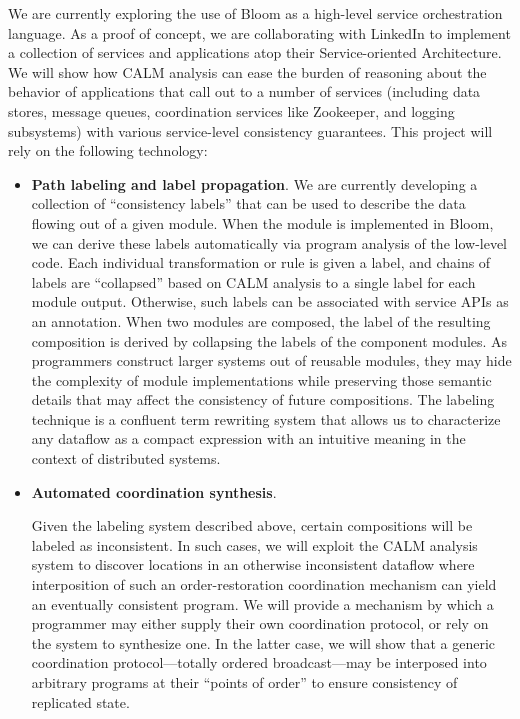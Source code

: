 We are currently exploring the use of Bloom as a high-level service orchestration language.
As a proof of concept, we are collaborating with LinkedIn to implement a collection of services and applications atop
their Service-oriented Architecture.
We will show how CALM analysis can ease the burden of reasoning about the behavior of applications
that call out to a number of services (including data stores, message queues, coordination services like Zookeeper, 
and logging subsystems)
with various service-level consistency guarantees.
This project will rely on the following technology:

\begin{itemize}
\item \textbf{Path labeling and label propagation}.
We are currently developing a collection of ``consistency labels'' that 
can be used to describe the data flowing out of a given module.  When the module
is implemented in Bloom, we can derive these labels automatically via program
analysis of the low-level code.  Each individual transformation or rule is 
given a label, and chains of labels are ``collapsed'' based on CALM analysis to 
a single label for each module output.  
Otherwise, such labels can be associated with service APIs as an annotation.  
When two modules are composed, the label of the resulting composition is derived
by collapsing the labels of the component modules.
As programmers construct larger systems out of reusable modules, they may 
hide the complexity of module implementations while preserving those semantic 
details that may affect the consistency of future compositions. The 
labeling technique is a confluent term rewriting system that allows us to 
characterize any dataflow as a compact expression with an intuitive 
meaning in the context of distributed systems.

\item \textbf{Automated coordination synthesis}.

Given the labeling system described above, certain compositions will be 
labeled as inconsistent.  In such cases, we will exploit the CALM
analysis system to discover locations in an otherwise 
inconsistent dataflow where interposition of such an order-restoration 
coordination mechanism can yield an eventually consistent program.
We will provide a mechanism by which a programmer may either supply 
their own coordination protocol, or rely on the system to synthesize one. 
In the latter case, we will show that a generic coordination 
protocol---totally ordered broadcast---may be interposed into arbitrary 
programs at their ``points of order''
to ensure consistency of replicated state.


\end{itemize}
